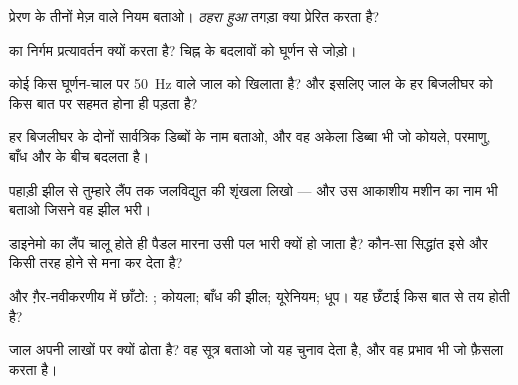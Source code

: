 \begin{exercise}[$\star$]\label{exo:g9:alternator:1}
प्रेरण के तीनों मेज़ वाले नियम बताओ। \emph{ठहरा हुआ} तगड़ा  क्या
प्रेरित करता है?
\end{exercise}

\begin{exercise}[$\star$]\label{exo:g9:alternator:2}
 का निर्गम प्रत्यावर्तन क्यों करता है? चिह्न के बदलावों
को घूर्णन से जोड़ो।
\end{exercise}

\begin{exercise}[$\star$]\label{exo:g9:alternator:3}
कोई  किस घूर्णन-चाल पर \qty{50}{Hz} वाले जाल को खिलाता
है? और इसलिए जाल के हर बिजलीघर को किस बात पर सहमत होना ही पड़ता है?
\end{exercise}

\begin{exercise}[$\star$]\label{exo:g9:alternator:4}
हर बिजलीघर के दोनों सार्वत्रिक डिब्बों के नाम बताओ, और वह अकेला डिब्बा
भी जो कोयले, परमाणु, बाँध और  के बीच बदलता है।
\end{exercise}

\begin{exercise}[$\star$]\label{exo:g9:alternator:5}
पहाड़ी झील से तुम्हारे लैंप तक जलविद्युत की शृंखला लिखो --- और उस
आकाशीय मशीन का नाम भी बताओ जिसने वह झील भरी।
\end{exercise}

\begin{exercise}[$\star$]\label{exo:g9:alternator:6}
डाइनेमो का लैंप चालू होते ही पैडल मारना उसी पल भारी क्यों हो जाता है?
कौन-सा सिद्धांत इसे और किसी तरह होने से मना कर देता है?
\end{exercise}

\begin{exercise}[$\star$]\label{exo:g9:alternator:7}
 और ग़ैर-नवीकरणीय में छाँटो: ; कोयला; बाँध की झील; यूरेनियम;
धूप। यह छँटाई किस बात से तय होती है?
\end{exercise}

\begin{exercise}[$\star$]\label{exo:g9:alternator:8}
जाल अपनी  लाखों  पर क्यों ढोता है? वह सूत्र बताओ जो यह चुनाव
देता है, और वह प्रभाव भी जो फ़ैसला करता है।
\end{exercise}

